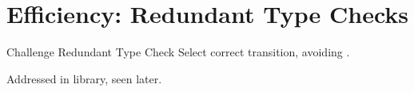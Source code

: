 \section{Efficiency: Redundant Type Checks}

{  %

\begin{frame}{Challenge }{Redundant Type Check}
  Select correct transition, avoiding .

  \medskip

  \scalebox{0.85}{}

  \medskip
  
  Addressed in  library, seen later.
\end{frame}
}


\newsavebox\typecaseAbox
\begin{lrbox}{\typecaseAbox}
  \begin{minipage}{8cm}
    
  \end{minipage}
\end{lrbox}

\newsavebox\typecaseITEbox
\begin{lrbox}{\typecaseITEbox}
  \begin{minipage}{8cm}
    
  \end{minipage}
\end{lrbox}

\newsavebox\typecaseITEafterbox
\begin{lrbox}{\typecaseITEafterbox}
  \begin{minipage}{8cm}

  \end{minipage}
\end{lrbox}

\newsavebox\typecaseBabox
\begin{lrbox}{\typecaseBabox}
  \begin{minipage}{8cm}

  \end{minipage}
\end{lrbox}

\newsavebox\typecaseBbox
\begin{lrbox}{\typecaseBbox}
  \begin{minipage}{8cm}
    
  \end{minipage}
\end{lrbox}


